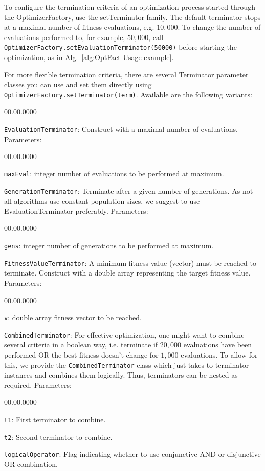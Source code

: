 To configure the termination criteria of an optimization process started
through the OptimizerFactory, use the setTerminator family. The default
terminator stops at a maximal number of fitness evaluations, e.g.
$10,000$. To change the number of evaluations performed to, for example,
$50,000$, call \texttt{Optim\-izer\-Fac\-tory.set\-Evaluation\-Ter\-mi\-na\-tor(50000)}
before starting the optimization, as in Alg.~\ref{alg:OptFact-Usage-example}.

For more flexible termination criteria, there are several Terminator
parameter classes you can use and set them directly using \texttt{Optim\-izer\-Fac\-tory.set\-Ter\-mi\-na\-tor(term)}.
Available are the following variants:
\begin{lyxlist}{00.00.0000}
\item [{\texttt{EvaluationTerminator}:}] Construct with a maximal number
of evaluations. Parameters: 

\begin{lyxlist}{00.00.0000}
\item [{\texttt{maxEval}:}] integer number of evaluations to be performed
at maximum.
\end{lyxlist}
\item [{\texttt{GenerationTerminator}:}] Terminate after a given number
of generations. As not all algorithms use constant population sizes,
we suggest to use EvaluationTerminator preferably. Parameters: 

\begin{lyxlist}{00.00.0000}
\item [{\texttt{gens}:}] integer number of generations to be performed
at maximum.
\end{lyxlist}
\item [{\texttt{FitnessValueTerminator}:}] A minimum fitness value (vector)
must be reached to terminate. Construct with a double array representing
the target fitness value. Parameters: 

\begin{lyxlist}{00.00.0000}
\item [{\texttt{v}:}] double array fitness vector to be reached.
\end{lyxlist}
\item [{\texttt{CombinedTerminator}:}] For effective optimization, one
might want to combine several criteria in a boolean way, i.e. terminate
if $20,000$ evaluations have been performed OR the best fitness doesn't
change for $1,000$ evaluations. To allow for this, we provide the
\texttt{CombinedTerminator} class which just takes to terminator instances
and combines them logically. Thus, terminators can be nested as required.
Parameters:

\begin{lyxlist}{00.00.0000}
\item [{\texttt{t1}:}] First terminator to combine.
\item [{\texttt{t2}:}] Second terminator to combine.
\item [{\texttt{logicalOperator}:}] Flag indicating whether to use conjunctive
AND or disjunctive OR combination.
\end{lyxlist}
\end{lyxlist}
